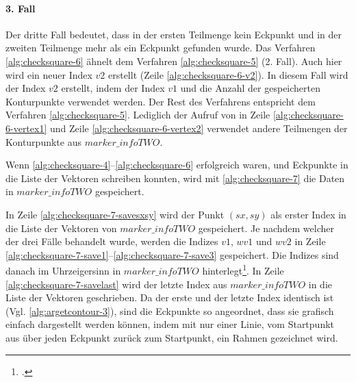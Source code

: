 


\paragraph{3. Fall} %
\label{par:3_fall}

Der dritte Fall bedeutet, dass in der ersten Teilmenge kein Eckpunkt und in der zweiten Teilmenge mehr als ein Eckpunkt
 gefunden wurde. Das Verfahren \autoref{alg:checksquare-6} ähnelt dem Verfahren \autoref{alg:checksquare-5} (2. Fall).
 Auch hier wird ein neuer Index $\mathit{v2}$ erstellt (Zeile \ref{alg:checksquare-6-v2}). In diesem Fall wird der
 Index $\mathit{v2}$ erstellt, indem der Index $\mathit{v1}$ und die Anzahl der gespeicherten Konturpunkte verwendet
 werden. Der Rest des Verfahrens entspricht dem Verfahren \autoref{alg:checksquare-5}. Lediglich der Aufruf von
  in Zeile \ref{alg:checksquare-6-vertex1} und Zeile \ref{alg:checksquare-6-vertex2} verwendet
 andere Teilmengen der Konturpunkte aus $\mathit{marker\_infoTWO}$.




Wenn \autoref{alg:checksquare-4}--\autoref{alg:checksquare-6} erfolgreich waren, und Eckpunkte in die Liste der
 Vektoren schreiben konnten, wird mit \autoref{alg:checksquare-7} die Daten in $\mathit{marker\_infoTWO}$ gespeichert.



In Zeile \ref{alg:checksquare-7-savesxsy} wird der Punkt $(\mathit{sx},\mathit{sy})$ als erster Index in die Liste der
 Vektoren von $\mathit{marker\_infoTWO}$ gespeichert. Je nachdem welcher der drei Fälle behandelt wurde, werden die
 Indizes $\mathit{v1}$, $\mathit{wv1}$ und $\mathit{wv2}$ in Zeile
 \ref{alg:checksquare-7-save1}--\ref{alg:checksquare-7-save3} gespeichert. Die Indizes sind danach im Uhrzeigersinn in
 $\mathit{marker\_infoTWO}$ hinterlegt\footcite[Vgl.][S.~44]{wagner07a}. In Zeile \ref{alg:checksquare-7-savelast} wird
 der letzte Index aus $\mathit{marker\_infoTWO}$ in die Liste der Vektoren geschrieben. Da der erste und der letzte
 Index identisch ist (Vgl. \autoref{alg:argetcontour-3}), sind die Eckpunkte so angeordnet, dass sie grafisch einfach
 dargestellt werden können, indem mit nur einer Linie, vom Startpunkt aus über jeden Eckpunkt zurück zum Startpunkt,
 ein Rahmen gezeichnet wird.

